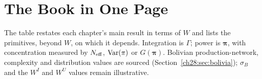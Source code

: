 \documentclass[../structural_economics_book.tex]{subfiles}
\begin{document}
\section{The Book in One Page}
\label{ch28:sec:corollaries}

\label{ch28:prop:book}
The table restates each chapter's main result in terms of $W$ and lists the primitives, beyond $W$, on which it depends. Integration is $\Gamma$; power is $\boldsymbol{\pi}$, with concentration measured by $N_{\text{eff}}$, $\operatorname{Var}(\pi)$ or $G(\boldsymbol{\pi})$. Bolivian production-network, complexity and distribution values are sourced (Section~\ref{ch28:sec:bolivia}); $\sigma_B$ and the $W^I$ and $W^U$ values remain illustrative.
\end{document}
